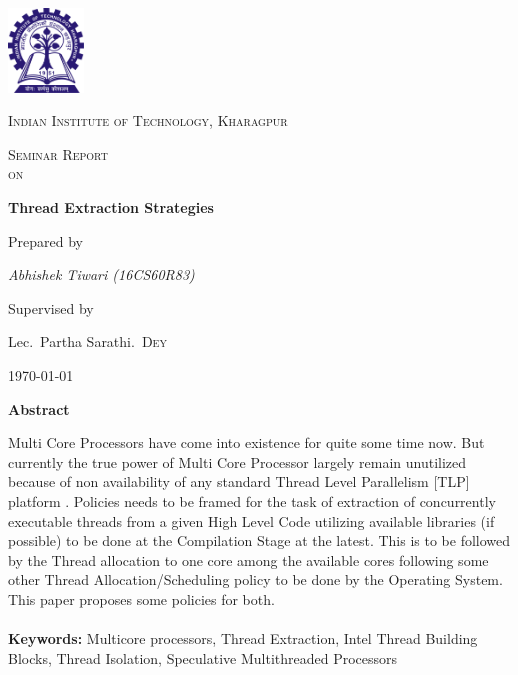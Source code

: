\documentclass[a4paper,12pt]{article}
\begin{document}
\begin{titlepage}
  \centering
  \includegraphics[width=0.15\textwidth]{iitkgp.png}\par\vspace{1cm}
  {\scshape\LARGE Indian Institute of Technology, Kharagpur \par}
  \vspace{1cm}
  {\scshape\Large Seminar Report \\ on \par}
  \vspace{1.5cm}
  {\huge\bfseries Thread Extraction Strategies \par}
  \vspace{2cm}
  {Prepared by\par\Large\itshape Abhishek Tiwari \textnormal{(16CS60R83)}\par}
  \vfill
  Supervised by\par
  Lec.~Partha Sarathi.~\textsc{Dey}

  \vfill

  {\large \today\par}
\end{titlepage}




\newpage
\tableofcontents
\listoffigures
\newpage

\begin{center} \LARGE \textbf{Abstract} 
\end{center}

Multi Core Processors have come into existence for quite some time now. But currently the true power of Multi Core Processor largely remain unutilized because of non availability of any standard Thread Level Parallelism [TLP] platform . Policies needs to be framed for the task of extraction of concurrently executable threads from a given High Level Code utilizing available libraries (if possible) to be done at the Compilation Stage at the latest. This is to be followed by the Thread allocation to one core among the available cores following some other Thread Allocation/Scheduling policy to be done by the Operating System. This paper proposes some policies for both.
\\
\\
\textbf{Keywords:}
Multicore processors, Thread Extraction, Intel Thread Building Blocks, Thread Isolation, Speculative Multithreaded Processors
\newpage
\end{document}
